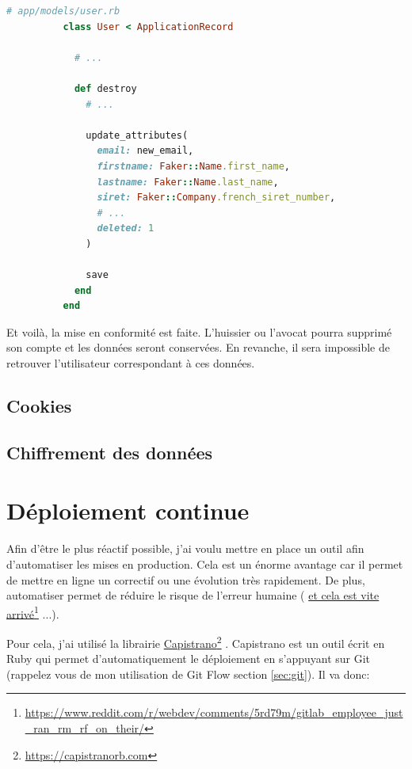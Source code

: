 \documentclass[]{report}
\newcommand\fnurl[2]{%
  \href{#1}{#2}\footnote{\url{#1}}%
}
\begin{document}
        \begin{scriptsize}
          \begin{lstlisting}[language=ruby]
          # app/models/user.rb
          class User < ApplicationRecord

            # ...

            def destroy
              # ...

              update_attributes(
                email: new_email,
                firstname: Faker::Name.first_name,
                lastname: Faker::Name.last_name,
                siret: Faker::Company.french_siret_number,
                # ...
                deleted: 1
              )

              save
            end
          end
          \end{lstlisting}
        \end{scriptsize}

        Et voilà, la mise en conformité est faite. L'huissier ou l'avocat pourra supprimé son compte et les données seront conservées. En revanche, il sera impossible de retrouver l'utilisateur correspondant à ces données.

    \subsection{Cookies}


    \subsection{Chiffrement des données}


  \section{Déploiement continue}\label{sec:deployments}

    Afin d'être le plus réactif possible, j'ai voulu mettre en place un outil afin d'automatiser les mises en production. Cela est un énorme avantage car il permet de mettre en ligne un correctif ou une évolution très rapidement. De plus, automatiser permet de réduire le risque de l'erreur humaine (\fnurl{https://www.reddit.com/r/webdev/comments/5rd79m/gitlab_employee_just_ran_rm_rf_on_their/}{et cela est vite arrivé}...).

    Pour cela, j'ai utilisé la librairie \fnurl{https://capistranorb.com}{Capistrano}. Capistrano est un outil écrit en Ruby qui permet d'automatiquement le déploiement en s'appuyant sur Git (rappelez vous de mon utilisation de Git Flow section \ref{sec:git}). Il va donc:
\end{document}
